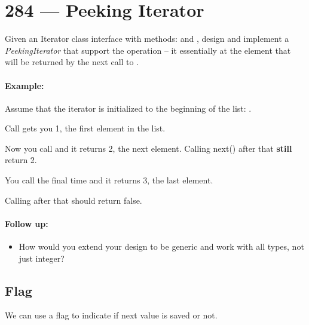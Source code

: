 \section{284 --- Peeking Iterator}
Given an Iterator class interface with methods:  and , design and implement a \textit{PeekingIterator} that support the  operation -- it essentially  at the element that will be returned by the next call to .

\paragraph{Example:}

\begin{flushleft}
Assume that the iterator is initialized to the beginning of the list: \fcj{[1,2,3]}.

Call  gets you 1, the first element in the list.

Now you call  and it returns 2, the next element. Calling next() after that \textbf{still} return 2. 

You call  the final time and it returns 3, the last element. 

Calling  after that should return false.
\end{flushleft}

\paragraph{Follow up:} 
\begin{itemize}
\item How would you extend your design to be generic and work with all types, not just integer?
\end{itemize}

\subsection{Flag}
We can use a flag to indicate if next value is saved or not.

